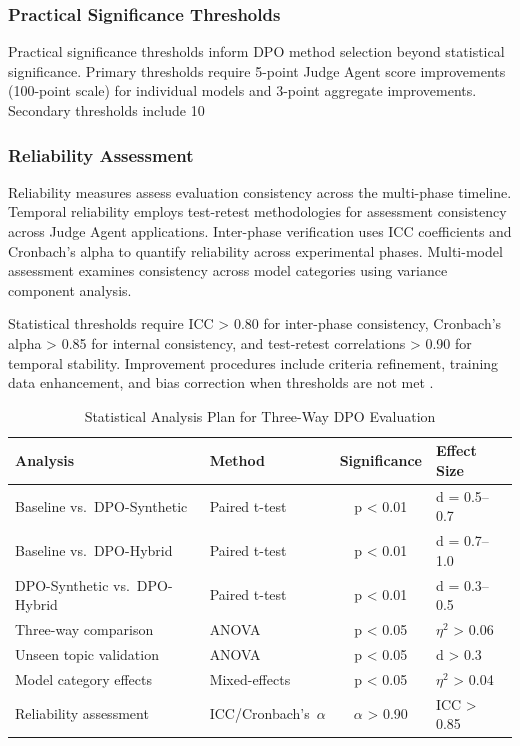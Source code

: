 \subsubsection{Practical Significance Thresholds}

Practical significance thresholds inform DPO method selection beyond statistical significance. Primary thresholds require 5-point Judge Agent score improvements (100-point scale) for individual models and 3-point aggregate improvements. Secondary thresholds include 10%

\subsubsection{Reliability Assessment}

Reliability measures assess evaluation consistency across the multi-phase timeline. Temporal reliability employs test-retest methodologies for assessment consistency across Judge Agent applications. Inter-phase verification uses ICC coefficients and Cronbach's alpha to quantify reliability across experimental phases. Multi-model assessment examines consistency across model categories using variance component analysis.

Statistical thresholds require ICC > 0.80 for inter-phase consistency, Cronbach's alpha > 0.85 for internal consistency, and test-retest correlations > 0.90 for temporal stability. Improvement procedures include criteria refinement, training data enhancement, and bias correction when thresholds are not met \cite{xu2024consistency_survey, chen2024meta_evaluation}.

\begin{table}[htbp]
    \centering
    \caption{Statistical Analysis Plan for Three-Way DPO Evaluation}
    \label{tab:statistical-analysis-plan}
    \begin{tabular}{|l|l|c|l|}
    \hline
    \textbf{Analysis} & \textbf{Method} & \textbf{Significance} & \textbf{Effect Size} \\
    \hline
    Baseline vs.~DPO-Synthetic & Paired t-test & p < 0.01 & d = 0.5--0.7 \\
    Baseline vs.~DPO-Hybrid & Paired t-test & p < 0.01 & d = 0.7--1.0 \\
    DPO-Synthetic vs.~DPO-Hybrid & Paired t-test & p < 0.01 & d = 0.3--0.5 \\
    Three-way comparison & ANOVA & p < 0.05 & \(\eta^2\) > 0.06 \\
    Unseen topic validation & ANOVA & p < 0.05 & d > 0.3 \\
    Model category effects & Mixed-effects & p < 0.05 & \(\eta^2\) > 0.04 \\
    Reliability assessment & ICC/Cronbach's~\(\alpha\) & \(\alpha\) > 0.90 & ICC > 0.85 \\
    \hline
    \end{tabular}
\end{table}

